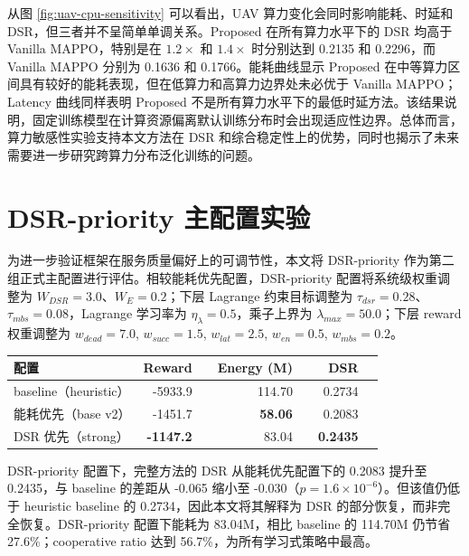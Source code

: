 从图 \ref{fig:uav-cpu-sensitivity} 可以看出，UAV 算力变化会同时影响能耗、时延和 DSR，但三者并不呈简单单调关系。Proposed 在所有算力水平下的 DSR 均高于 Vanilla MAPPO，特别是在 $1.2\times$ 和 $1.4\times$ 时分别达到 0.2135 和 0.2296，而 Vanilla MAPPO 分别为 0.1636 和 0.1766。能耗曲线显示 Proposed 在中等算力区间具有较好的能耗表现，但在低算力和高算力边界处未必优于 Vanilla MAPPO；Latency 曲线同样表明 Proposed 不是所有算力水平下的最低时延方法。该结果说明，固定训练模型在计算资源偏离默认训练分布时会出现适应性边界。总体而言，算力敏感性实验支持本文方法在 DSR 和综合稳定性上的优势，同时也揭示了未来需要进一步研究跨算力分布泛化训练的问题。

\section{DSR-priority 主配置实验}
\label{sec:dsr-priority}

为进一步验证框架在服务质量偏好上的可调节性，本文将 DSR-priority 作为第二组正式主配置进行评估。相较能耗优先配置，DSR-priority 配置将系统级权重调整为 $W_{DSR}=3.0$、$W_E=0.2$；下层 Lagrange 约束目标调整为 $\tau_{dsr}=0.28$、$\tau_{mbs}=0.08$，Lagrange 学习率为 $\eta_{\lambda}=0.5$，乘子上界为 $\lambda_{max}=50.0$；下层 reward 权重调整为 $w_{dead}=7.0$, $w_{succ}=1.5$, $w_{lat}=2.5$, $w_{en}=0.5$, $w_{mbs}=0.2$。

\begin{table}[!htbp]
    \centering
    \label{tab:dsr-priority}
    \begin{tabular}{l|rr|rr|rr}
        \hline
        配置 & Reward & & Energy (M) & & DSR & \\
        \hline
        baseline（heuristic） & -5933.9 & & 114.70 & & 0.2734 & \\
        能耗优先（base v2） & -1451.7 & & \textbf{58.06} & & 0.2083 & \\
        DSR 优先（strong） & \textbf{-1147.2} & & 83.04 & & \textbf{0.2435} & \\
        \hline
    \end{tabular}
\end{table}

DSR-priority 配置下，完整方法的 DSR 从能耗优先配置下的 0.2083 提升至 0.2435，与 baseline 的差距从 -0.065 缩小至 -0.030（$p = 1.6\times10^{-6}$）。但该值仍低于 heuristic baseline 的 0.2734，因此本文将其解释为 DSR 的部分恢复，而非完全恢复。DSR-priority 配置下能耗为 83.04M，相比 baseline 的 114.70M 仍节省 27.6\%；cooperative ratio 达到 56.7\%，为所有学习式策略中最高。


